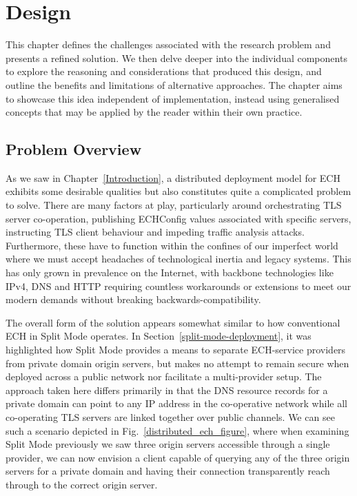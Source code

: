 \chapter{Design}\label{Design}

This chapter defines the challenges associated with the research problem and presents a refined solution. We then delve deeper into the individual components to explore the reasoning and considerations that produced this design, and outline the benefits and limitations of alternative approaches. The chapter aims to showcase this idea independent of implementation, instead using generalised concepts that may be applied by the reader within their own practice.



\section{Problem Overview}

As we saw in Chapter~\ref{Introduction}, a distributed deployment model for ECH exhibits some desirable qualities but also constitutes quite a complicated problem to solve. There are many factors at play, particularly around orchestrating TLS server co-operation, publishing ECHConfig values associated with specific servers, instructing TLS client behaviour and impeding traffic analysis attacks. Furthermore, these have to function within the confines of our imperfect world where we must accept headaches of technological inertia and legacy systems. This has only grown in prevalence on the Internet, with backbone technologies like IPv4, DNS and HTTP requiring countless workarounds or extensions to meet our modern demands without breaking backwards-compatibility.

The overall form of the solution appears somewhat similar to how conventional ECH in Split Mode operates. In Section~\ref{split-mode-deployment}, it was highlighted how Split Mode provides a means to separate ECH-service providers from private domain origin servers, but makes no attempt to remain secure when deployed across a public network nor facilitate a multi-provider setup. The approach taken here differs primarily in that the DNS resource records for a private domain can point to any IP address in the co-operative network while all co-operating TLS servers are linked together over public channels. We can see such a scenario depicted in Fig.~\ref{distributed_ech_figure}, where when examining Split Mode previously we saw three origin servers accessible through a single provider, we can now envision a client capable of querying any of the three origin servers for a private domain and having their connection transparently reach through to the correct origin server.

